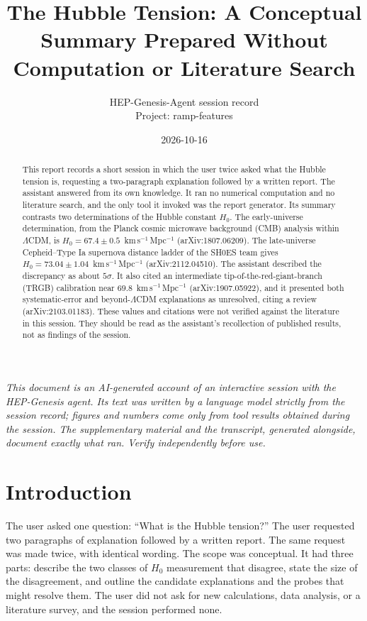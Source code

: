 \documentclass[11pt,a4paper]{article}
\title{The Hubble Tension: A Conceptual Summary Prepared Without Computation or Literature Search}
\author{HEP-Genesis-Agent session record \\ \small Project: ramp-features}
\date{2026-10-16}
\begin{document}
\maketitle
\noindent\textit{\small This document is an AI-generated account of an interactive session with the HEP-Genesis agent. Its text was written by a language model strictly from the session record; figures and numbers come only from tool results obtained during the session. The supplementary material and the transcript, generated alongside, document exactly what ran. Verify independently before use.}
\vspace{1em}

\begin{abstract}
This report records a short session in which the user twice asked what the Hubble tension is, requesting a two-paragraph explanation followed by a written report. The assistant answered from its own knowledge. It ran no numerical computation and no literature search, and the only tool it invoked was the report generator. Its summary contrasts two determinations of the Hubble constant $H_0$. The early-universe determination, from the Planck cosmic microwave background (CMB) analysis within $\Lambda$CDM, is $H_0 = 67.4 \pm 0.5$~km\,s$^{-1}$\,Mpc$^{-1}$ (arXiv:1807.06209). The late-universe Cepheid--Type Ia supernova distance ladder of the SH0ES team gives $H_0 = 73.04 \pm 1.04$~km\,s$^{-1}$\,Mpc$^{-1}$ (arXiv:2112.04510). The assistant described the discrepancy as about $5\sigma$. It also cited an intermediate tip-of-the-red-giant-branch (TRGB) calibration near $69.8$~km\,s$^{-1}$\,Mpc$^{-1}$ (arXiv:1907.05922), and it presented both systematic-error and beyond-$\Lambda$CDM explanations as unresolved, citing a review (arXiv:2103.01183). These values and citations were not verified against the literature in this session. They should be read as the assistant's recollection of published results, not as findings of the session.
\end{abstract}

\section{Introduction}
The user asked one question: ``What is the Hubble tension?'' The user requested two paragraphs of explanation followed by a written report. The same request was made twice, with identical wording. The scope was conceptual. It had three parts: describe the two classes of $H_0$ measurement that disagree, state the size of the disagreement, and outline the candidate explanations and the probes that might resolve them. The user did not ask for new calculations, data analysis, or a literature survey, and the session performed none.
\end{document}
